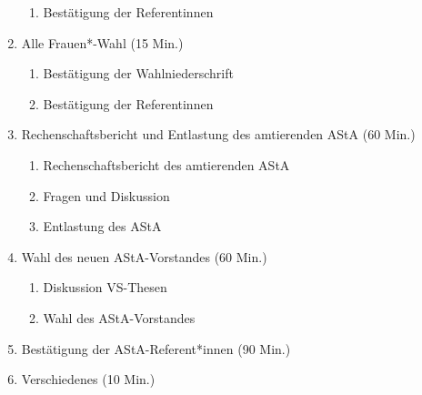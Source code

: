 \documentclass[ngerman,headheight=70pt]{scrartcl}
\begin{document}
\begin{enumerate}[label={\textbf{Top \theenumi}},leftmargin=*]
\begin{enumerate}
                \item Bestätigung der Referentinnen
            \end{enumerate}
        \item Alle Frauen*-Wahl (15 Min.)
            \begin{enumerate}
                \item Bestätigung der Wahlniederschrift
                \item Bestätigung der Referentinnen
            \end{enumerate}
        \item Rechenschaftsbericht und Entlastung des amtierenden AStA (60 Min.)
            \begin{enumerate}
                \item Rechenschaftsbericht des amtierenden AStA
                \item Fragen und Diskussion
                \item Entlastung des AStA
              \end{enumerate}
        \item Wahl des neuen AStA-Vorstandes (60 Min.)
            \begin{enumerate}
                \item Diskussion VS-Thesen
                \item Wahl des AStA-Vorstandes
            \end{enumerate}
        \item Bestätigung der AStA-Referent*innen (90 Min.)
        \item Verschiedenes (10 Min.)
    \end{enumerate}
\end{document}

